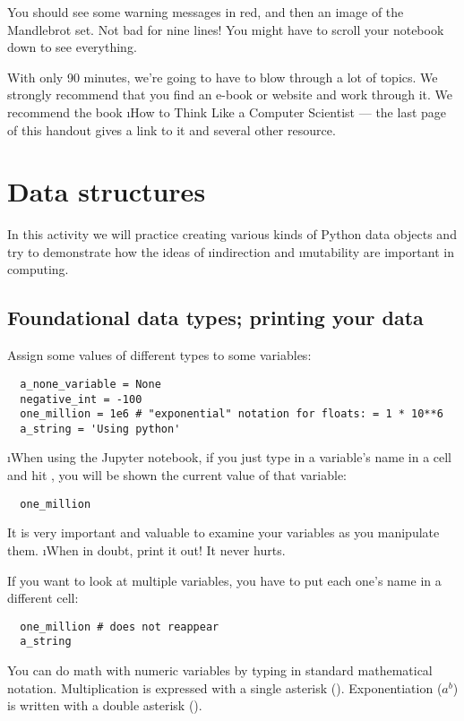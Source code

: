 \documentclass[letterpaper, 12pt, titlepage, twoside]{article}
\begin{document}
You should see some warning messages in red, and then an image of the
Mandlebrot set. Not bad for nine lines! You might have to scroll your notebook
down to see everything.

With only 90 minutes, we're going to have to blow through a lot of topics. We
strongly recommend that you find an e-book or website and work through it. We
recommend the book \i{How to Think Like a Computer Scientist} --- the last
page of this handout gives a link to it and several other resource.


\newpage
\section{Data structures}

In this activity we will practice creating various kinds of Python data
objects and try to demonstrate how the ideas of \i{indirection} and
\i{mutability} are important in computing.

\subsection*{Foundational data types; printing your data}

Assign some values of different types to some variables:

\begin{lstlisting}
  a_none_variable = None
  negative_int = -100
  one_million = 1e6 # "exponential" notation for floats: = 1 * 10**6
  a_string = 'Using python'
\end{lstlisting}

\i{When using the Jupyter notebook}, if you just type in a variable's name in
a cell and hit , you will be shown the current value of that
variable:

\begin{lstlisting}
  one_million
\end{lstlisting}

It is very important and valuable to examine your variables as you manipulate
them. \i{When in doubt, print it out!} It never hurts.

If you want to look at multiple variables, you have to put each one's name in
a different cell:

\begin{lstlisting}
  one_million # does not reappear
  a_string
\end{lstlisting}

You can do math with numeric variables by typing in standard mathematical
notation. Multiplication is expressed with a single asterisk (\s{*}).
Exponentiation ($a^b$) is written with a double asterisk ().
\end{document}
